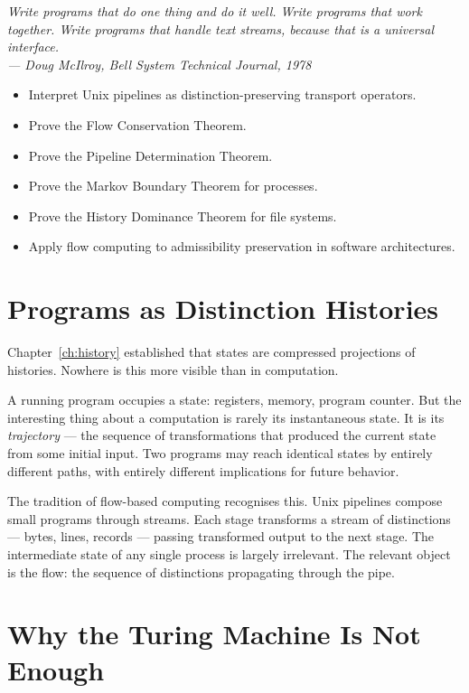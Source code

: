 \documentclass[12pt,twoside,openright]{book}
\newenvironment{epigraph}[2]{%
  \vspace{1em}\begin{flushright}
  \begin{minipage}{0.72\textwidth}
  \itshape\small #1\\[0.4em]
  \upshape\footnotesize\sffamily\color{DistGray}--- #2
  \end{minipage}\end{flushright}\vspace{1.5em}}{}
\newenvironment{objectives}{%
  \begin{tcolorbox}[colback=DistBlue!5,colframe=DistBlue,
    title={\faCheckCircle\enspace Learning Objectives},
    fonttitle=\sffamily\bfseries\color{white},
    attach boxed title to top left={yshift=-2mm,xshift=4mm},
    boxed title style={colback=DistBlue},breakable]
  \begin{itemize}[leftmargin=*,nosep]}{%
  \end{itemize}\end{tcolorbox}\vspace{1em}}
\begin{document}
\begin{epigraph}{%
  Write programs that do one thing and do it well.
  Write programs that work together.
  Write programs that handle text streams, because that is
  a universal interface.}%
  {Doug McIlroy, \textit{Bell System Technical Journal}, 1978}
\end{epigraph}

\begin{objectives}
  \item Interpret Unix pipelines as distinction-preserving
        transport operators.
  \item Prove the Flow Conservation Theorem.
  \item Prove the Pipeline Determination Theorem.
  \item Prove the Markov Boundary Theorem for processes.
  \item Prove the History Dominance Theorem for file systems.
  \item Apply flow computing to admissibility preservation
        in software architectures.
\end{objectives}

\section{Programs as Distinction Histories}

Chapter~\ref{ch:history} established that states are
compressed projections of histories. Nowhere is this
more visible than in computation.

A running program occupies a state: registers, memory,
program counter. But the interesting thing about a
computation is rarely its instantaneous state. It is its
\emph{trajectory} — the sequence of transformations that
produced the current state from some initial input. Two
programs may reach identical states by entirely different
paths, with entirely different implications for future
behavior.

The tradition of flow-based computing recognises this.
Unix pipelines compose small programs through streams.
Each stage transforms a stream of distinctions — bytes,
lines, records — passing transformed output to the next
stage. The intermediate state of any single process is
largely irrelevant. The relevant object is the flow: the
sequence of distinctions propagating through the pipe.

\section{Why the Turing Machine Is Not Enough}
\label{sec:ch23-why-turing}
\end{document}
